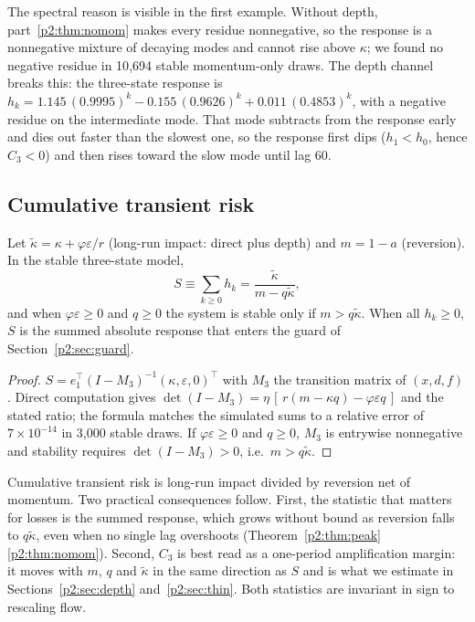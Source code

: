 The spectral reason is visible in the first example. Without depth, part~\ref{p2:thm:nomom} makes every residue nonnegative, so the response is a nonnegative mixture of decaying modes and cannot rise above $\kappa$; we found no negative residue in 10{,}694 stable momentum-only draws. The depth channel breaks this: the three-state response is $h_k=1.145\,(0.9995)^k-0.155\,(0.9626)^k+0.011\,(0.4853)^k$, with a negative residue on the intermediate mode. That mode subtracts from the response early and dies out faster than the slowest one, so the response first dips ($h_1<h_0$, hence $C_3<0$) and then rises toward the slow mode until lag 60.

\subsection{Cumulative transient risk}

\begin{theorem}\label{p2:thm:sum}
Let $\tilde\kappa=\kappa+\varphi\varepsilon/r$ (long-run impact: direct plus depth) and $m=1-a$ (reversion). In the stable three-state model,
\[
S\equiv\sum_{k\ge0}h_k=\frac{\tilde\kappa}{m-q\tilde\kappa},
\]
and when $\varphi\varepsilon\ge0$ and $q\ge0$ the system is stable only if $m>q\tilde\kappa$. When all $h_k\ge0$, $S$ is the summed absolute response that enters the guard of Section~\ref{p2:sec:guard}.
\end{theorem}

\begin{proof}
$S=e_1^\top(I-M_3)^{-1}(\kappa,\varepsilon,0)^\top$ with $M_3$ the transition matrix of $(x,d,f)$. Direct computation gives $\det(I-M_3)=\eta\,[\,r(m-\kappa q)-\varphi\varepsilon q\,]$ and the stated ratio; the formula matches the simulated sums to a relative error of $7\times10^{-14}$ in 3{,}000 stable draws. If $\varphi\varepsilon\ge0$ and $q\ge0$, $M_3$ is entrywise nonnegative and stability requires $\det(I-M_3)>0$, i.e.\ $m>q\tilde\kappa$.
\end{proof}

Cumulative transient risk is long-run impact divided by reversion net of momentum. Two practical consequences follow. First, the statistic that matters for losses is the summed response, which grows without bound as reversion falls to $q\tilde\kappa$, even when no single lag overshoots (Theorem~\ref{p2:thm:peak}\ref{p2:thm:nomom}). Second, $C_3$ is best read as a one-period amplification margin: it moves with $m$, $q$ and $\tilde\kappa$ in the same direction as $S$ and is what we estimate in Sections~\ref{p2:sec:depth} and~\ref{p2:sec:thin}. Both statistics are invariant in sign to rescaling flow.
